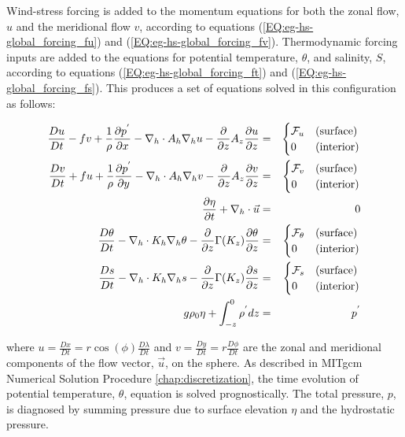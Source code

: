 {Wind-stress forcing is added to the momentum equations for both
the zonal flow, $u$ and the meridional flow $v$, according to equations 
(\ref{EQ:eg-hs-global_forcing_fu}) and (\ref{EQ:eg-hs-global_forcing_fv}).
Thermodynamic forcing inputs are added to the equations for
potential temperature, $\theta$, and salinity, $S$, according to equations 
(\ref{EQ:eg-hs-global_forcing_ft}) and (\ref{EQ:eg-hs-global_forcing_fs}).
This produces a set of equations solved in this configuration as follows:

\begin{eqnarray}
\label{EQ:eg-hs-model_equations}
\frac{Du}{Dt} - fv + 
  \frac{1}{\rho}\frac{\partial p^{'}}{\partial x} - 
  \nabla_{h}\cdot A_{h}\nabla_{h}u - 
  \frac{\partial}{\partial z}A_{z}\frac{\partial u}{\partial z} 
 & = &
\begin{cases}
{\cal F}_u & \text{(surface)} \\
0 & \text{(interior)}
\end{cases}
\\
\frac{Dv}{Dt} + fu + 
  \frac{1}{\rho}\frac{\partial p^{'}}{\partial y} - 
  \nabla_{h}\cdot A_{h}\nabla_{h}v - 
  \frac{\partial}{\partial z}A_{z}\frac{\partial v}{\partial z} 
& = &
\begin{cases}
{\cal F}_v & \text{(surface)} \\
0 & \text{(interior)}
\end{cases}
\\
\frac{\partial \eta}{\partial t} + \nabla_{h}\cdot \vec{u}
&=&
0
\\
\frac{D\theta}{Dt} -
 \nabla_{h}\cdot K_{h}\nabla_{h}\theta
 - \frac{\partial}{\partial z}\Gamma(K_{z})\frac{\partial\theta}{\partial z} 
& = &
\begin{cases}
{\cal F}_\theta & \text{(surface)} \\
0 & \text{(interior)}
\end{cases}
\\
\frac{D s}{Dt} -
 \nabla_{h}\cdot K_{h}\nabla_{h}s
 - \frac{\partial}{\partial z}\Gamma(K_{z})\frac{\partial s}{\partial z} 
& = &
\begin{cases}
{\cal F}_s & \text{(surface)} \\
0 & \text{(interior)}
\end{cases}
\\
g\rho_{0} \eta + \int^{0}_{-z}\rho^{'} dz & = & p^{'}
\end{eqnarray}

\noindent where $u=\frac{Dx}{Dt}=r \cos(\phi)\frac{D \lambda}{Dt}$ and 
$v=\frac{Dy}{Dt}=r \frac{D \phi}{Dt}$ 
are the zonal and meridional components of the
flow vector, $\vec{u}$, on the sphere. As described in
MITgcm Numerical Solution Procedure \ref{chap:discretization}, the time 
evolution of potential temperature, $\theta$, equation is solved prognostically.
The total pressure, $p$, is diagnosed by summing pressure due to surface 
elevation $\eta$ and the hydrostatic pressure.
\\

}
